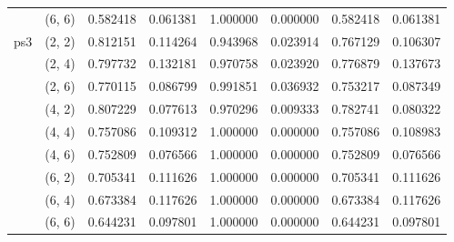 \begin{tabular}{llrrrrrr}
    & (6, 6) &  0.582418 &  0.061381 &  1.000000 &  0.000000 &  0.582418 &  0.061381 \\
ps3 & (2, 2) &  0.812151 &  0.114264 &  0.943968 &  0.023914 &  0.767129 &  0.106307 \\
    & (2, 4) &  0.797732 &  0.132181 &  0.970758 &  0.023920 &  0.776879 &  0.137673 \\
    & (2, 6) &  0.770115 &  0.086799 &  0.991851 &  0.036932 &  0.753217 &  0.087349 \\
    & (4, 2) &  0.807229 &  0.077613 &  0.970296 &  0.009333 &  0.782741 &  0.080322 \\
    & (4, 4) &  0.757086 &  0.109312 &  1.000000 &  0.000000 &  0.757086 &  0.108983 \\
    & (4, 6) &  0.752809 &  0.076566 &  1.000000 &  0.000000 &  0.752809 &  0.076566 \\
    & (6, 2) &  0.705341 &  0.111626 &  1.000000 &  0.000000 &  0.705341 &  0.111626 \\
    & (6, 4) &  0.673384 &  0.117626 &  1.000000 &  0.000000 &  0.673384 &  0.117626 \\
    & (6, 6) &  0.644231 &  0.097801 &  1.000000 &  0.000000 &  0.644231 &  0.097801 \\
\bottomrule
\end{tabular}
